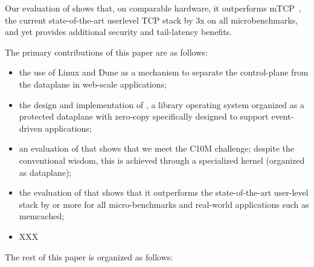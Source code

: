  Our evaluation of \ix shows that, on comparable hardware, it
outperforms mTCP~\cite{jeong2014mtcp}, the current state-of-the-art userlevel TCP stack by
3x on all microbenchmarks, and yet provides additional security and
tail-latency benefits.

The primary contributions of this paper are as follows:

\begin{itemize}

\item  the use of Linux and Dune as a mechanism to separate the control-plane from the dataplane in web-scale applications;

\item the design and implementation of \ix, a library operating system
  organized as a protected dataplane with zero-copy specifically
  designed to support event-driven applications;

\item an evaluation of \ix that shows that we meet the C10M challenge;
  despite the conventional wisdom, this is achieved through a
  specialized kernel (organized as dataplane);

\item the evaluation of \ix that shows that it outperforms the
  state-of-the-art user-level stack by  or more for all
  micro-benchmarks and real-world applications such as memcached;

\item XXX

\end{itemize}


The rest of this paper is organized as follows: 





